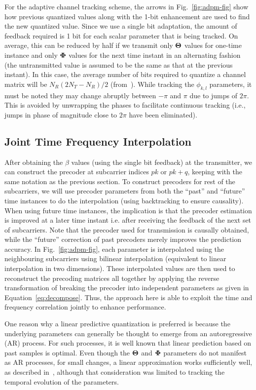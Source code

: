 \documentclass[journal,10pt,twocolumn]{IEEEtran}
\begin{document}
For the adaptive channel tracking scheme, the arrows in
Fig.~\ref{fig:adpm-fig} show how previous quantized values along with
the 1-bit enhancement are used to find the new quantized value. Since
we use a single bit adaptation, the amount of feedback required is 1
bit for each scalar parameter that is being tracked. On average, this
can be reduced by half if we transmit only $\bf{\Theta}$ values for
one-time instance and only $\bf{\Phi}$ values for the next time
instant in an alternating fashion (the untransmitted value is assumed
to be the same as that at the previous instant). In this case, the
average number of bits required to quantize a channel matrix will be
$N_{R}(2N_{T} - N_R )/2$ (from~\cite{4114278}). While tracking
the $\phi_{k,l}$ parameters, it must be noted they may change abruptly
between $-\pi$ and $\pi$ due to jumps of $2\pi$. This is avoided by
unwrapping the phases to facilitate continuous tracking (i.e., jumps
in phase of magnitude close to $2\pi$ have been eliminated).
\subsection{Joint Time Frequency Interpolation}
\label{interp}
After obtaining the $\beta$ values (using the single bit feedback) at
the transmitter, we can construct the precoder at subcarrier indices
$pk$ or $pk+q$, keeping with the same notation as the previous
section. To construct precoders for rest of the subcarriers, we will use
precoder parameters from both the ``past'' and ``future'' time
instances to do the interpolation (using backtracking to ensure
causality). When using future time instances, the implication is that the precoder
estimation is improved at a later time instant i.e. after receiving
the feedback of the next set of subcarriers. Note that the precoder
used for transmission is causally obtained, while the ``future''
correction of past precoders merely improves the prediction
accuracy. In Fig.~\ref{fig:adpm-fig}, each parameter is interpolated
using the neighbouring subcarriers using bilinear interpolation
(equivalent to linear interpolation in two dimensions). These
interpolated values are then used to reconstruct the precoding
matrices all together by applying the reverse transformation of
breaking the precoder into independent parameters as given in
Equation~\ref{eq:decompose}. Thus, the approach here is able to
exploit the time and frequency correlation jointly to enhance
performance.

One reason why a linear predictive quantization is preferred is
because the underlying parameters can generally be thought to emerge
from an autoregressive (AR) process. For such processes, it is well
known that linear prediction based on past samples is optimal. Even
though the $\bf{\Theta}$ and $\bf{\Phi}$ parameters do not manifest as AR
processes, for small changes, a linear approximation works
sufficiently well, as described in~\cite{4114278}, although that
consideration was limited to tracking the temporal evolution of the
parameters.
\end{document}
